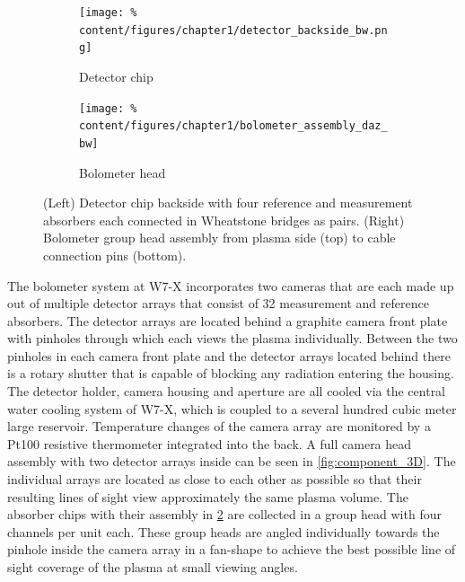 %
            \begin{figure}[t]%
                \centering%
                \begin{subfigure}{0.375\textwidth}%
                    \centering%
                    \texttt{[image: \%
                        content/figures/chapter1/detector\_backside\_bw.png]}%
                    \vspace*{0.25cm}%
                    \caption{Detector chip}\label{fig:chip}%
                \end{subfigure}%
                \hspace*{1.0cm}%
                \begin{subfigure}{0.33\textwidth}%
                    \centering%
                    \texttt{[image: \%
                        content/figures/chapter1/bolometer\_assembly\_daz\_bw]}%
                    \caption{Bolometer head}\label{fig:assembly}%
                \end{subfigure}%
                \caption{(Left) Detector chip backside with four reference and measurement absorbers each connected in Wheatstone bridges as pairs. (Right) Bolometer group head assembly from plasma side (top) to cable connection pins (bottom).}\label{fig:wheatstone_assembly}%
            \end{figure}%
%
            The bolometer system at W7-X incorporates two cameras that are each made up out of multiple detector arrays that consist of 32 measurement and reference absorbers. The detector arrays are located behind a graphite camera front plate with pinholes through which each views the plasma individually. Between the two pinholes in each camera front plate and the detector arrays located behind there is a rotary shutter that is capable of blocking any radiation entering the housing. The detector holder, camera housing and aperture are all cooled via the central water cooling system of W7-X, which is coupled to a several hundred cubic meter large reservoir. Temperature changes of the camera array are monitored by a Pt100 resistive thermometer integrated into the back. A full camera head assembly with two detector arrays inside can be seen in \cref{fig:component_3D}. The individual arrays are located as close to each other as possible so that their resulting lines of sight view approximately the same plasma volume. The absorber chips with their assembly in \cref{fig:assembly} are collected in a group head with four channels per unit each. These group heads are angled individually towards the pinhole inside the camera array in a fan-shape to achieve the best possible line of sight coverage of the plasma at small viewing angles.\\%
